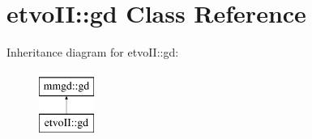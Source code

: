 \hypertarget{classetvo_i_i_1_1gd}{}\section{etvo\+II\+:\+:gd Class Reference}
\label{classetvo_i_i_1_1gd}
Inheritance diagram for etvo\+II\+:\+:gd\+:\begin{figure}[H]
\begin{center}
\leavevmode
\includegraphics[height=2.000000cm]{classetvo_i_i_1_1gd}
\end{center}
\end{figure}
